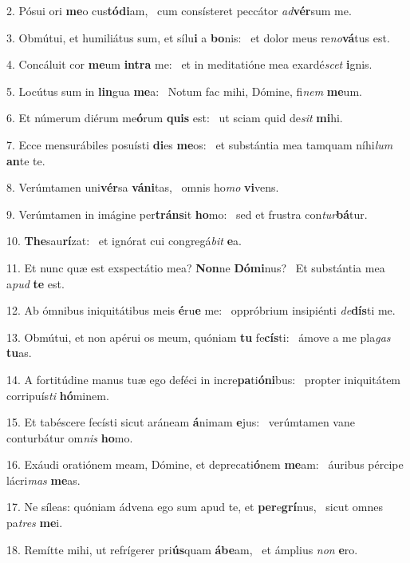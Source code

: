 2. Pósui ori \textbf{me}o cus\textbf{tó}\textbf{di}am, \ast\  cum consísteret peccátor \textit{ad}\textbf{vér}sum me.\

3. Obmútui, et humiliátus sum, et sílu\textbf{i} a \textbf{bo}nis: \ast\  et dolor meus re\textit{no}\textbf{vá}tus est.\

4. Concáluit cor \textbf{me}um \textbf{in}\textbf{tra} me: \ast\  et in meditatióne mea exardé\textit{scet} \textbf{i}gnis.\

5. Locútus sum in \textbf{lin}gua \textbf{me}a: \ast\  Notum fac mihi, Dómine, fi\textit{nem} \textbf{me}um.\

6. Et númerum diérum me\textbf{ó}rum \textbf{quis} est: \ast\  ut sciam quid de\textit{sit} \textbf{mi}hi.\

7. Ecce mensurábiles posuísti \textbf{di}es \textbf{me}os: \ast\  et substántia mea tamquam níhi\textit{lum} \textbf{an}te te.\

8. Verúmtamen uni\textbf{vér}sa \textbf{vá}\textbf{ni}tas, \ast\  omnis ho\textit{mo} \textbf{vi}vens.\

9. Verúmtamen in imágine per\textbf{tráns}it \textbf{ho}mo: \ast\  sed et frustra con\textit{tur}\textbf{bá}tur.\

10. \textbf{The}sau\textbf{rí}zat: \ast\  et ignórat cui congregá\textit{bit} \textbf{e}a.\

11. Et nunc quæ est exspectátio mea? \textbf{Non}ne \textbf{Dó}\textbf{mi}nus? \ast\  Et substántia mea a\textit{pud} \textbf{te} est.\

12. Ab ómnibus iniquitátibus meis \textbf{é}ru\textbf{e} me: \ast\  oppróbrium insipiénti \textit{de}\textbf{dís}ti me.\

13. Obmútui, et non apérui os meum, quóniam \textbf{tu} fe\textbf{cís}ti: \ast\  ámove a me pla\textit{gas} \textbf{tu}as.\

14. A fortitúdine manus tuæ ego deféci in incre\textbf{pa}ti\textbf{ó}\textbf{ni}bus: \ast\  propter iniquitátem corripuís\textit{ti} \textbf{hó}minem.\

15. Et tabéscere fecísti sicut aráneam \textbf{á}nimam \textbf{e}jus: \ast\  verúmtamen vane conturbátur om\textit{nis} \textbf{ho}mo.\

16. Exáudi oratiónem meam, Dómine, et deprecati\textbf{ó}nem \textbf{me}am: \ast\  áuribus pércipe lácri\textit{mas} \textbf{me}as.\

17. Ne síleas: quóniam ádvena ego sum apud te, et \textbf{per}e\textbf{grí}nus, \ast\  sicut omnes pa\textit{tres} \textbf{me}i.\

18. Remítte mihi, ut refrígerer pri\textbf{ús}quam \textbf{á}\textbf{be}am, \ast\  et ámplius \textit{non} \textbf{e}ro.\

